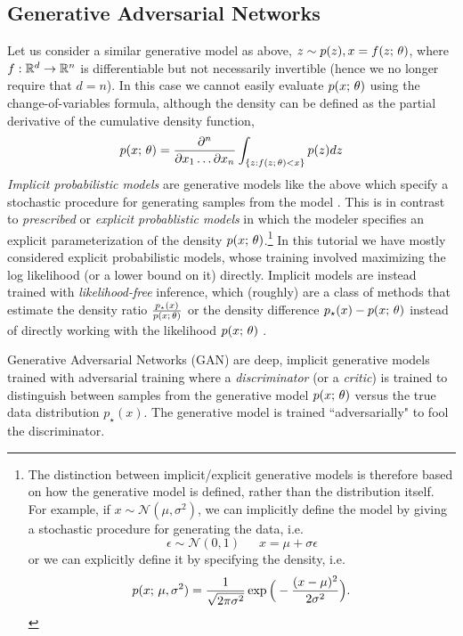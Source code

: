\documentclass{article}
\begin{document}
\subsection{Generative Adversarial Networks}\label{gan}
Let us consider a similar generative model as above, $z \sim p(z), x =  f(z ; \, \theta)$,
where $f: \mathbb{R}^d \to \mathbb{R}^n$ is differentiable but not necessarily invertible (hence we no longer require that $d = n$). In this case we cannot easily
evaluate $p(x ; \, \theta)$ using the change-of-variables formula, although the density
can be defined as the partial derivative of the cumulative density function, 
\[ p(x ; \, \theta) = \frac{\partial^n}{\partial x_1 \dots \partial x_n}\int_{\{z : f(z; \, \theta) < x \}} p(z) dz \]
\emph{Implicit probabilistic models} are generative models like the above which specify a stochastic procedure for generating samples from the model \citep{mohamed2016}. This is in contrast to \emph{prescribed} or \emph{explicit probablistic models} in which the modeler specifies an explicit parameterization of the density $p(x ; \, \theta)$.\footnote{The distinction between implicit/explicit generative models is therefore based on how the generative model is defined, rather than the distribution itself. For example, if $x \sim \mathcal{N}(\mu, \sigma^2)$, we can implicitly define the model by giving a stochastic procedure for generating the data, i.e.
\[ \epsilon \sim \mathcal{N}(0, 1) \,\,\,\,\,\,\,\,\, x = \mu + \sigma\epsilon\]
or we can explicitly define it by specifying the density, i.e.
\[ p(x ; \, \mu, \sigma^2) = \frac{1}{\sqrt{2\pi\sigma^2}}\exp\Big(-\frac{(x-\mu)^2}{2\sigma^2}\Big).\]} In this tutorial we have mostly considered explicit probabilistic models, whose training involved maximizing the log likelihood (or a lower bound on it) directly. Implicit models are instead trained with \emph{likelihood-free} inference, which (roughly) are a class of methods that estimate the density ratio $\frac{p_\star(x)}{p(x ; \, \theta)}$ or the density difference $p_\star(x) -p(x ; \, \theta)$
instead of directly working with the likelihood $p(x ; \, \theta)$ \citep{marin2012,gutmann2012,gutmann2014,bernton2017}.

Generative Adversarial Networks (GAN) \citep{goodfellow2014generative} are deep, implicit generative
models trained with adversarial training where a \emph{discriminator} (or a \emph{critic})
is trained to distinguish between samples from the generative model $p(x ; \, \theta)$ versus the true data distribution $p_\star(x)$. The generative model is trained ``adversarially" to fool the discriminator.
\end{document}
